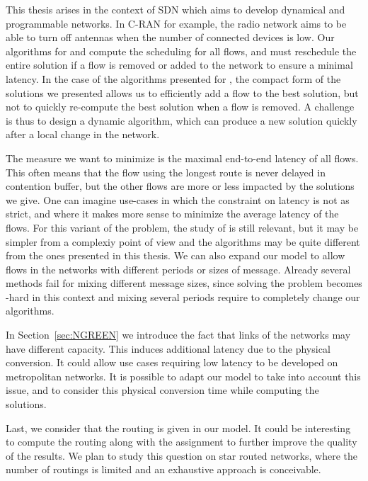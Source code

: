 This thesis arises in the context of SDN which aims to develop dynamical and programmable networks. In C-RAN for example, the radio network aims to be able to turn off antennas when the number of connected devices is low. Our algorithms for \pazl and \pall compute the scheduling for all flows, and must reschedule the entire solution if a flow is removed or added to the network to ensure a minimal latency. In the case of the algorithms presented for \minstra, the compact form of the solutions we presented allows us to efficiently add a flow to the best solution, but not to quickly re-compute the best solution when a flow is removed. A challenge is thus to design a dynamic algorithm, which can produce a new solution quickly after 
a local change in the network.

The measure we want to minimize is the maximal end-to-end latency of all flows. This often means that the flow using the longest route is never delayed in contention buffer, but the other flows are more or less impacted by the solutions we give. One can imagine use-cases in which the constraint on latency is not as strict, and where it makes more sense
to minimize the average latency of the flows. For this variant of the problem, the study of \pazl is still relevant, but it may be simpler from a complexiy point of view
and the algorithms may be quite different from the ones presented in this thesis.
 We can also expand our model to allow flows in the networks with different periods or sizes of message. Already several methods fail for mixing different message sizes, 
 since solving the problem \wta becomes \NP-hard in this context and mixing several periods require to completely change our algorithms.

In Section~\ref{sec:NGREEN} we introduce the fact that links of the networks may have different capacity. This induces additional latency due to the physical conversion. It could allow use cases requiring low latency to be developed on metropolitan networks. It is possible to adapt our model to take into account this issue, and to consider this physical conversion time while computing the solutions. 

Last, we consider that the routing is given in our model. It could be interesting to compute the routing 
along with the assignment to further improve the quality of the results. We plan to study this question on star routed networks, where the number of 
routings is limited and an exhaustive approach is conceivable. 
